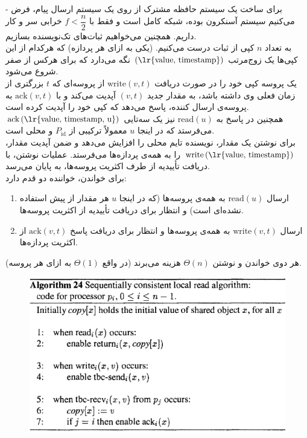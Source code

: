 \documentclass{article}
\begin{document}
\begin{multicols}{2}
- برای ساخت یک سیستم حافظه مشترک از روی یک سیستم ارسال پیام، فرض می‌کنیم سیستم آسنکرون بوده، شبکه کامل است و فقط با
$f<\dfrac{n}{2}$
خرابی سر و کار داریم. همچنین می‌خواهیم ثبات‌های تک‌نویسنده بسازیم.\\
به تعداد $n$ کپی از ثبات درست می‌کنیم. (یکی به ازای هر پردازه) که هرکدام از این کپی‌ها یک زوج‌مرتب
$\left( \text{\lr{value, timestamp}} \right)$
نگه می‌دارد که برای هرکس از صفر شروع می‌شود. \\
یک پروسه کپی خود را در صورت دریافت
$\text{write}\left( v, t \right)$
از پروسه‌ای که $t$ بزرگتری از زمان فعلی وی داشته باشد،
به مقدار جدید
$\left( v, t \right)$
آپدیت می‌کند و با
$\text{ack}\left( v, t \right)$
به پروسه‌ی ارسال کننده، پاسخ می‌دهد که کپی خود را آپدیت کرده است.\\
همچنین در پاسخ به
$\text{read}\left( u \right)$
نیز یک سه‌تایی
$\text{ack}\left( \text{\lr{value, timestamp, u}} \right)$
می‌فرستد که در اینجا $u$
معمولاً ترکیبی از $P_{\text{id}}$ و  محلی است.\\
برای نوشتن یک مقدار، نویسنده تایم محلی را افزایش می‌دهد و ضمن آپدیت مقدار،
$\text{write}\left(\text{\lr{value, timestamp}} \right)$
را به همه‌ی پردازه‌ها می‌فرستد. عملیات نوشتن، با دریافت تأییدیه از طرف اکثریت پروسه‌ها، به پایان می‌رسد.\\
برای خواندن، خواننده دو قدم دارد:
\begin{enumerate}
  \item ارسال 
  $\text{read}\left( u \right)$
  به همه‌ی پروسه‌ها (که در اینجا $u$ هر مقدار از پیش استفاده نشده‌ای است)
  و انتظار برای دریافت تأییدیه از اکثریت پروسه‌ها.
  \item ارسال
  $\text{write}\left( v, t \right)$
  به همه‌ی پروسه‌ها و انتظار برای دریافت پاسخ
  $\text{ack}\left( v, t \right)$
  از اکثریت پردازه‌ها.
\end{enumerate}
هر دوی خواندن و نوشتن
$\Theta \left( n \right)$
هزینه می‌برند (در واقع
$\Theta \left( 1 \right)$
به ازای هر پروسه).
\begin{figure}[H]
        \centering
        \includegraphics[width=0.75\linewidth]{Photos/HW1/read.PNG}

\end{figure}
\end{multicols}
\end{document}
